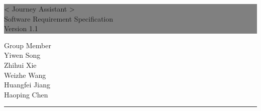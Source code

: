 \documentclass[10pt]{article}
\begin{document}

\begin{titlepage} %
	
	
	\colorbox{grey}{
		\parbox[t]{1.1\textwidth}{ %
			\parbox[t]{1.02\textwidth}{ %
				\raggedleft %
				\fontsize{34pt}{40pt}\selectfont %
				\vspace{0.7cm} %
				
				< Journey Assistant >\\
                Software Requirement Specification\\
                Version 1.1\\
				
				\vspace{0.7cm} %
			}
		}
	}
	
	\vfill %
	
	
	\parbox[t]{1\textwidth}{ %
		\raggedleft %
		\large %
		{\Large Group Member}\\[4pt] %
        Yiwen Song\\
        Zhihui Xie\\
        Weizhe Wang\\
        Huangfei Jiang\\
        Haoping Chen\\
		
		\hfill\rule{0.2\linewidth}{1pt}%
    }
    
	
\end{titlepage}
\end{document}
